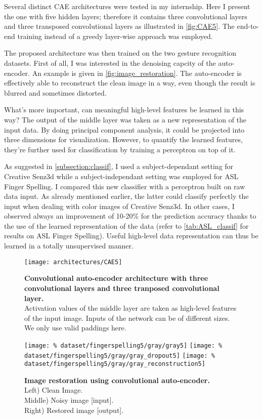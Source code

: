 Several distinct CAE architectures were tested in my internship.
Here I present the one with five hidden layers; therefore it contains
three convolutional layers and three transposed convolutional layers
as illustrated in \autoref{fig:CAE5}. The end-to-end training instead of
a greedy layer-wise approach was employed.

The proposed architecture was then trained on the two gesture recognition
datasets. First of all, I was interested in the denoising capcity of
the auto-encoder. An example is given in \autoref{fig:image_restoration}.
The auto-encoder is effectively able to reconstruct the clean image in
a way, even though the result is blurred and sometimes distorted.

What's more important, can meaningful high-level features be
learned in this way? The output of the middle layer was taken as a
new representation of the input data.
By doing principal component analysis, it could be projected into
three dimensions for visualization.
However, to quantify the learned features, they're further used for
classification by training a perceptron on top of it.

As suggested in \ref{subsection:classif}, I used a subject-dependant setting
for Creative Senz3d while a subject-independant setting was employed
for ASL Finger Spelling. I compared this new classifier with a
perceptron built on raw data input. As already mentioned earlier, the
latter could classify perfectly the input when dealing with color images
of Creative Senz3d. In other cases, I observed always an improvement
of 10-20\% for the prediction accuracy thanks to the use of the
learned representation of the data (refer to \autoref{tab:ASL_classif}
for results on ASL Finger Spelling). Useful high-level data representation
can thus be learned in a totally unsupervised manner.

\begin{figure}[H]
  \centering
  \texttt{[image: architectures/CAE5]}
  \caption{%
    \textbf{Convolutional auto-encoder architecture with 
      three convolutional layers and three tranposed convolutional
      layer.}\\[0.1em]
    Activation values of the middle layer are taken as 
      high-level features of the input image. Inputs of the network
      can be of different sizes. We only use valid paddings here.}
  \label{fig:CAE5}
\end{figure}

\begin{figure}[H]
  \centering
  \hfill
  \texttt{[image: \%
    dataset/fingerspelling5/gray/gray5]}
  \hfill
  \texttt{[image: \%
    dataset/fingerspelling5/gray/gray\_dropout5]}
  \hfill
  \texttt{[image: \%
    dataset/fingerspelling5/gray/gray\_reconstruction5]}
  \caption{%
    \textbf{Image restoration using convolutional auto-encoder.}\\[0.1em]
      Left) Clean Image.\\[0.1em]
      Middle) Noisy image [input].\\[0.1em]
      Right) Restored image [output].}
  \label{fig:image_restoration}
\end{figure}

